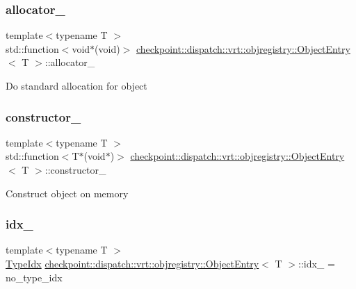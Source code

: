 \subsubsection{\texorpdfstring{allocator\+\_\+}{allocator\_}}
{\footnotesize\ttfamily template$<$typename T $>$ \\
std\+::function$<$void$\ast$(void)$>$ \hyperlink{structcheckpoint_1_1dispatch_1_1vrt_1_1objregistry_1_1_object_entry}{checkpoint\+::dispatch\+::vrt\+::objregistry\+::\+Object\+Entry}$<$ T $>$\+::allocator\+\_\+}

Do standard allocation for object \mbox{\label{structcheckpoint_1_1dispatch_1_1vrt_1_1objregistry_1_1_object_entry_a2280096c968c25eec0f9d641ece38d23}} 
\subsubsection{\texorpdfstring{constructor\+\_\+}{constructor\_}}
{\footnotesize\ttfamily template$<$typename T $>$ \\
std\+::function$<$T$\ast$(void$\ast$)$>$ \hyperlink{structcheckpoint_1_1dispatch_1_1vrt_1_1objregistry_1_1_object_entry}{checkpoint\+::dispatch\+::vrt\+::objregistry\+::\+Object\+Entry}$<$ T $>$\+::constructor\+\_\+}

Construct object on memory \mbox{\label{structcheckpoint_1_1dispatch_1_1vrt_1_1objregistry_1_1_object_entry_a95864cbf2656db8f3d003f1d7d59ad0e}} 
\subsubsection{\texorpdfstring{idx\+\_\+}{idx\_}}
{\footnotesize\ttfamily template$<$typename T $>$ \\
\hyperlink{namespacecheckpoint_1_1dispatch_1_1vrt_acd3f9e6b091bcfbc23dc35ea8ef45d3b}{Type\+Idx} \hyperlink{structcheckpoint_1_1dispatch_1_1vrt_1_1objregistry_1_1_object_entry}{checkpoint\+::dispatch\+::vrt\+::objregistry\+::\+Object\+Entry}$<$ T $>$\+::idx\+\_\+ = no\+\_\+type\+\_\+idx}

